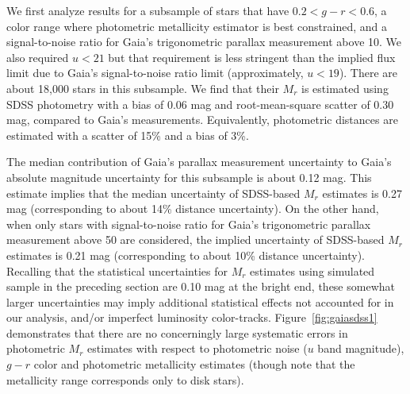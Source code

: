 We first analyze results for a subsample of stars that have $0.2 < g − r < 0.6$, a color range where photometric metallicity estimator is best constrained,
and a signal-to-noise ratio for Gaia's trigonometric
parallax measurement above 10.  We also required $u<21$ but that requirement is less stringent than the implied flux limit due to
Gaia's signal-to-noise ratio limit (approximately, $u<19$). There are about 18,000 stars in this subsample.
We find that their $M_r$ is estimated using SDSS photometry with a bias of 0.06 mag and root-mean-square scatter of 0.30 mag, compared
to Gaia's measurements. Equivalently, photometric distances  are estimated with a scatter of 15\% and a bias of 3\%.

The median contribution of Gaia's parallax measurement uncertainty to Gaia's absolute
magnitude uncertainty for this subsample is about 0.12 mag. This estimate implies that the median uncertainty of SDSS-based $M_r$
estimates is 0.27 mag (corresponding to about 14\% distance uncertainty). On the other hand, when only stars with signal-to-noise
ratio for Gaia's trigonometric parallax measurement above 50 are considered, the implied uncertainty of SDSS-based $M_r$
estimates is 0.21 mag (corresponding to about 10\% distance uncertainty).  Recalling that the statistical uncertainties for $M_r$
estimates using simulated sample in the preceding section are 0.10 mag at the bright end, these somewhat larger uncertainties may
imply additional statistical effects not accounted for in our analysis, and/or imperfect luminosity color-tracks.
Figure~\ref{fig:gaiasdss1} demonstrates that there are no concerningly large systematic errors in photometric $M_r$ estimates with
respect to photometric noise ($u$ band magnitude), $g-r$ color and photometric metallicity estimates (though note that the metallicity
range corresponds only to disk stars).

